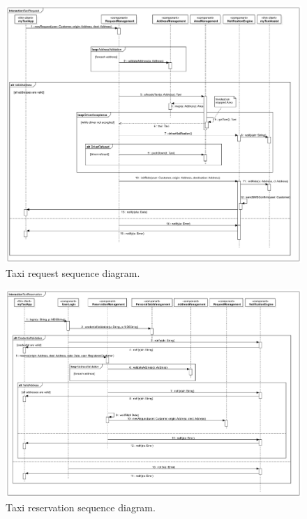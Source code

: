 \begin{figure}%
	\centering%
	\includegraphics[width=\linewidth]{img/Sequence__Collaboration1__Interaction1__TaxiRequest_2}%
	\caption{Taxi request sequence diagram.}\label{fig:reqSequence}%
\end{figure}

\begin{figure}%
	\centering%
	\includegraphics[width=\textwidth]{img/Sequence__Collaboration2__Interaction1__TaxiReservation_3}%
	\caption{Taxi reservation sequence diagram.}\label{fig:resSequence}%
\end{figure}
























